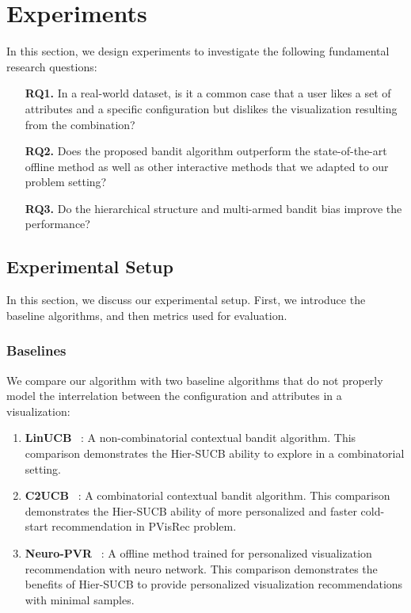 
\section{Experiments}
In this section, we design experiments to investigate the following fundamental research questions:
\begin{itemize}
    \item [\bf RQ1.] In a real-world dataset, is it a common case that a user likes a set of attributes and a specific configuration but dislikes the visualization resulting from the combination?
    \item [\bf RQ2.] Does the proposed bandit algorithm outperform the state-of-the-art offline method as well as other interactive methods that we adapted to our problem setting?
    \item [\bf RQ3.] Do the hierarchical structure and multi-armed bandit bias improve the performance?
\end{itemize}

\subsection{Experimental Setup} 

In this section, we discuss our experimental setup. 
First, we introduce the baseline algorithms, and then metrics used for evaluation.
\subsubsection{Baselines}
We compare our algorithm with two baseline algorithms that do not properly model the interrelation between the configuration and attributes in a visualization:
\begin{enumerate}
    \item \textbf{LinUCB} ~\cite{chu2011contextual}:  A non-combinatorial contextual bandit algorithm. This comparison demonstrates the Hier-SUCB ability to explore in a combinatorial setting. 
    \item \textbf{C2UCB} ~\cite{qin_contextual_2014}: A combinatorial contextual bandit algorithm. This comparison demonstrates the Hier-SUCB ability of more personalized and faster cold-start recommendation in PVisRec problem. 
    \item \textbf{Neuro-PVR} ~\cite{qian_personalized_2021}: A offline method trained for personalized visualization recommendation with neuro network. This comparison demonstrates the benefits of Hier-SUCB to provide personalized visualization recommendations with minimal samples.
\end{enumerate}

